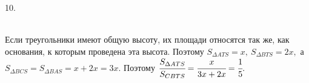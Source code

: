 10. \begin{figure}[ht!]
\end{figure}\\
Если треугольники имеют общую высоту, их площади относятся так же, как основания, к которым проведена эта высота. Поэтому $S_{\Delta ATS}=x,\ S_{\Delta BTS}=2x,$ а $S_{\Delta BCS}=S_{\Delta BAS}=x+2x=3x.$ Поэтому $\cfrac{S_{\Delta ATS}}{S_{CBTS}}=\cfrac{x}{3x+2x}=\cfrac{1}{5}.$\\
